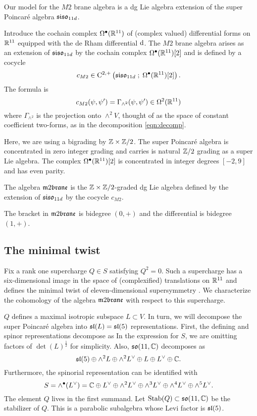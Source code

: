 Our model for the $M2$ brane algebra is a dg Lie algebra extension of the super Poincar\'e algebra $\mathfrak{siso}_{11d}$.
 
Introduce the cochain complex $\Omega^{\bullet}(\mathbb R^{11})$ of (complex valued) differential forms on $\mathbb R^{11}$ equipped with the de Rham differential ${\rm d}$.
The $M2$ brane algebra arises as an extension of $\mathfrak{siso}_{11d}$ by the cochain complex $\Omega^\bullet(\mathbb R^{11})[2]$ and is defined by a cocycle
\[
    c_{M2} \in {\rm C}^{2,+} \left(\mathfrak{siso}_{11d} \; ; \; \Omega^\bullet (\mathbb R^{11})[2]\right) .
\]
The formula is
  \[c_{M2} (\psi, \psi') = \Gamma_{\wedge^2}(\psi, \psi') \in \Omega^2(\mathbb R^{11})\]
  where $\Gamma_{\wedge^2}$ is the projection onto $\wedge^2 V$, thought of as the space of constant coefficient two-forms, as in the decomposition \eqref{eqn:decomp}.
  
Here, we are using a bigrading by $\mathbb Z \times \mathbb Z/2$. 
The super Poincar\'e algebra is concentrated in zero integer grading and carries is natural $\mathbb Z/2$ grading as a super Lie algebra.
The complex $\Omega^{\bullet}(\mathbb R^{11})[2]$ is concentrated in integer degrees $[-2,9]$ and has even parity.

\begin{dfn}
The algebra $\m2$ is the $\mathbb Z \times \mathbb Z/2$-graded dg Lie algebra defined by the extension of $\mathfrak{siso}_{11d}$ by the cocycle $c_{M2}$.  
\end{dfn}

The bracket in $\m2$ is bidegree $(0,+)$ and the differential is bidegree $(1,+)$.

\subsection{The minimal twist}
\label{sec:mintwist}

Fix a rank one supercharge $Q \in S$ satisfying $Q^2 = 0$.
Such a supercharge has a six-dimensional image in the space of (complexified) translations on $\mathbb R^{11}$ and defines the minimal twist of eleven-dimensional supersymmetry \cite{SWspinor}. 
We characterize the cohomology of the algebra $\m2$ with respect to this supercharge. 

$Q$ defines a maximal isotropic subspace $L \subset V$. 
In turn, we will decompose the super Poincar\'e algebra into $\mathfrak{sl}(L) = \mathfrak{sl}(5)$ representations.
First, the defining and spinor representations decompose as
In the expression for $S$, we are omitting factors of $\det(L)^{\frac12}$ for simplicity. 
Also, $\mathfrak{so}(11, \mathbb C)$ decomposes as
\[
\mathfrak{sl}(5) \oplus \wedge^2 L \oplus \wedge^2 L^\vee \oplus L \oplus L^\vee \oplus \mathbb{C} .
\]
Furthermore, the spinorial representation can be identified with
\[
S = \wedge^\bullet (L^\vee) = \mathbb C \oplus L^\vee \oplus \wedge^2 L^\vee \oplus \wedge^3 L^\vee \oplus \wedge^4 L^\vee \oplus \wedge^5 L^\vee .
\]
The element $Q$ lives in the first summand.
Let ${\rm Stab}(Q) \subset \mathfrak{so}(11,\mathbb C)$ be the stabilizer of $Q$. 
This is a parabolic subalgebra whose Levi factor is $\mathfrak{sl}(5)$.

